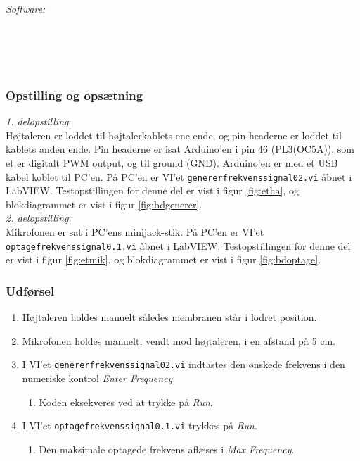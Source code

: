 		\textit{Software:}\\
		\labview\\
		\visa\\
		\vi\\
		\ardsw\
		
		\subsubsection{Opstilling og opsætning}
		\textit{1. delopstilling}:\\
		Højtaleren er loddet til højtalerkablets ene ende, og pin headerne er loddet til kablets anden ende. 
		Pin headerne er isat Arduino'en i pin 46 (PL3(OC5A)), som et er digitalt PWM output, og til ground (GND). 
		Arduino'en er med et USB kabel koblet til PC'en. 		
		På PC'en er VI'et \texttt{genererfrekvenssignal02.vi} åbnet i LabVIEW. Testopstillingen for denne del er vist i figur \ref{fig:etha}, og blokdiagrammet er vist i figur \ref{fig:bdgenerer}.\\ 
 
		\textit{2. delopstilling}:\\
		Mikrofonen er sat i PC'ens minijack-stik. På PC'en er VI'et \texttt{optagefrekvenssignal0.1.vi} åbnet i LabVIEW. Testopstillingen for denne del er vist i figur \ref{fig:etmik}, og blokdiagrammet er vist i figur \ref{fig:bdoptage}.\\ 
		
		\subsubsection{Udførsel}
			\begin{enumerate}
				\item Højtaleren holdes manuelt således membranen står i lodret position. 
				\item Mikrofonen holdes manuelt, vendt mod højtaleren, i en afstand på 5 cm. 
				\item I VI'et \texttt{genererfrekvenssignal02.vi} indtastes den ønskede frekvens i den numeriske kontrol \textit{Enter Frequency}. 
					\begin{enumerate}
						\item Koden eksekveres ved at trykke på \textit{Run}. 
					\end{enumerate} 
				\item I VI'et \texttt{optagefrekvenssignal0.1.vi} trykkes på \textit{Run}. 
					\begin{enumerate}
						\item Den maksimale optagede frekvens aflæses i \textit{Max Frequency}. 
					\end{enumerate}	  
			\end{enumerate}
			
